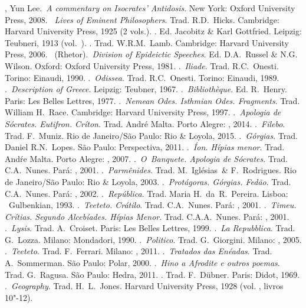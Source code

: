 \begin{bibliohedra}
, Yun Lee.~\emph{A commentary on Isocrates' Antidosis}. New York:
  Oxford University Press, 2008.
~\emph{Lives of Eminent Philosophers}. Trad. R.D.~Hicks. Cambridge: Harvard University Press, 1925 (2 vols.).
. Ed. Jacobitz \& Karl Gottfried.
  Leipzig: Teubneri, 1913 (vol.~).
. Trad. W.R.M.~Lamb. Cambridge: Harvard University Press, 2006.
~(Rhetor).~\emph{Division of Epideictic Speeches}. Ed. D.A.~Russel \& N.G. Wilson.
  Oxford: Oxford University Press, 1981.
.~\emph{Iliade}. Trad. R.C.~Onesti. Torino: Einaudi, 1990.
.~\emph{Odissea}. Trad. R.C.~Onesti. Torino: Einaudi, 1989.
.~\emph{Description of Greece}. Leipzig: Teubner, 1967.
.~\emph{Bibliothèque}. Ed. R.~Henry. Paris: Les Belles
  Lettres, 1977.
.~\emph{Nemean Odes. Isthmian Odes. Fragments}. Trad. William H.~Race. Cambridge: Harvard University Press, 1997.
.~\emph{Apologia de Sócrates. Eutifron.
  Críton}. Trad. André Malta. Porto Alegre: , 2014.
.~\emph{Filebo}. Trad. F.~Muniz. Rio de Janeiro/São Paulo:  Rio \& Loyola,
  2015.
.~\emph{Górgias}. Trad. Daniel R.N.~Lopes. São Paulo:
  Perspectiva, 2011.
.\emph{~Íon. Hípias menor}. Trad. Andŕe Malta. Porto
  Alegre: , 2007.
.~\emph{O~Banquete. Apologia de Sócrates}. Trad. C.A.~Nunes.
  Pará: , 2001.
.~\emph{Parmênides}. Trad. M.~Iglésias~\& F.~Rodrigues. Rio de Janeiro/São
  Paulo:  Rio \& Loyola, 2003.
.~\emph{Protágoras. Górgias. Fedão}. Trad. C.A.~Nunes. Pará:
  , 2002.
.~\emph{República}. Trad. Maria H.~da~R.~Pereira. Lisboa:
  ~Gulbenkian, 1993.
.~\emph{Teeteto. Crátilo}. Trad. C.A.~Nunes. Pará: , 2001.
.~\emph{Timeu. Crítias. Segundo Alcebíades. Hípias Menor}.
  Trad. C.A.A.~Nunes. Pará: , 2001.
.~\emph{Lysis}. Trad. A.~Croiset. Paris: Les Belles Lettres,
  1999.
.~\emph{La Repubblica}. Trad. G.~Lozza. Milano: Mondadori,
  1990.
.~\emph{Politico}. Trad. G.~Giorgini. Milano: , 2005.
.~\emph{Teeteto}. Trad. F.~Ferrari. Milano: , 2011.
.~\emph{Tratados das Enéadas}. Trad. A.~Sommerman. São Paulo: Polar, 2000.
.~\emph{Hino a Afrodite e outros poemas}. Trad. G.~Ragusa. São Paulo: Hedra, 2011.
. Trad. F.~Dübner. Paris:
  Didot, 1969.
.~\emph{Geography}. Trad. H.~L.~Jones.
  Harvard University Press, 1928 (vol. , livros 10"-12).
\end{bibliohedra}

